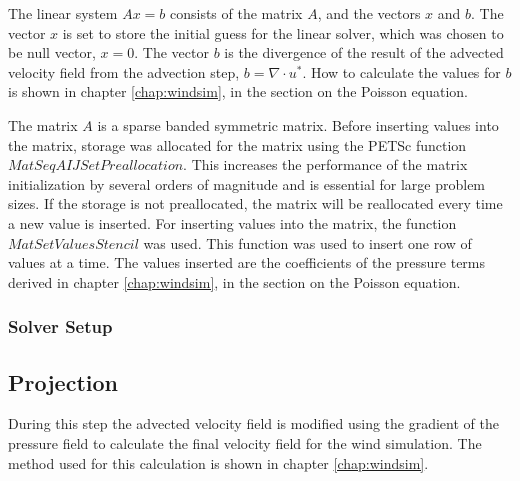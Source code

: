 The linear system $Ax = b$ consists of the matrix $A$, and the vectors $x$ and
$b$. The vector $x$ is set to store the initial guess for the linear solver,
which was chosen to be null vector, $x = 0$. The vector $b$ is the divergence of
the result of the advected velocity field from the advection step, $b = \nabla
\cdot u^*$. How to calculate the values for $b$ is shown in chapter 
\ref{chap:windsim}, in the section on the Poisson equation.

The matrix $A$ is a sparse banded symmetric matrix. Before inserting values into
the matrix, storage was allocated for the matrix using the PETSc function
$MatSeqAIJSetPreallocation$. This increases the performance of the matrix
initialization by several orders of magnitude and is essential for large problem
sizes. If the storage is not preallocated, the matrix will be reallocated every
time a new value is inserted. For inserting values into the matrix, the function
$MatSetValuesStencil$ was used. This function was used to insert one row of 
values at a time. The values inserted are the coefficients of the pressure terms
derived in chapter \ref{chap:windsim}, in the section on the Poisson equation.

\subsubsection{Solver Setup}

\subsection{Projection}

During this step the advected velocity field is modified using the gradient of
the pressure field to calculate the final velocity field for the wind simulation.
The method used for this calculation is shown in chapter \ref{chap:windsim}.
